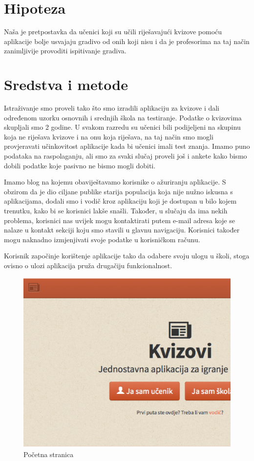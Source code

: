 \documentclass{scrreprt}
\begin{document}
\chapter{Hipoteza}

Naša je pretpostavka da učenici koji su učili riješavajući kvizove pomoću
aplikacije bolje usvajaju gradivo od onih koji nisu i da je profesorima na taj
način zanimljivije provoditi ispitivanje gradiva.

\chapter{Sredstva i metode}

Istraživanje smo proveli tako što smo izradili aplikaciju za kvizove i dali
određenom uzorku osnovnih i srednjih škola na testiranje. Podatke o kvizovima
skupljali smo 2 godine. U svakom razredu su učenici bili podijeljeni na skupinu
koja ne riješava kvizove i na onu koja riješava, na taj način smo mogli
provjeravati učinkovitost aplikacije kada bi učenici imali test znanja. Imamo
puno podataka na raspolaganju, ali smo za svaki slučaj proveli još i ankete kako
bismo dobili podatke koje pasivno ne bismo mogli dobiti.

Imamo blog na kojemu obaviještavamo korisnike o ažuriranju aplikacije. S obzirom
da je dio ciljane publike starija populacija koja nije nužno iskusna s
aplikacijama, dodali smo i vodič kroz aplikaciju koji je dostupan u bilo kojem
trenutku, kako bi se korisnici lakše snašli. Također, u slučaju da ima nekih
problema, korisnici nas uvijek mogu kontaktirati putem e-mail adresa koje se
nalaze u kontakt sekciji koju smo stavili u glavnu navigaciju. Korisnici također
mogu naknadno izmjenjivati svoje podatke u korisničkom računu.

Korisnik započinje korištenje aplikacije tako da odabere svoju ulogu u školi,
stoga ovisno o ulozi aplikacija pruža drugačiju funkcionalnost.

\begin{figure}[H]
  \includegraphics[width=\textwidth, clip=true, trim=0 7cm 0 0, fbox]{home}
  \caption{Početna stranica}
\end{figure}
\end{document}

